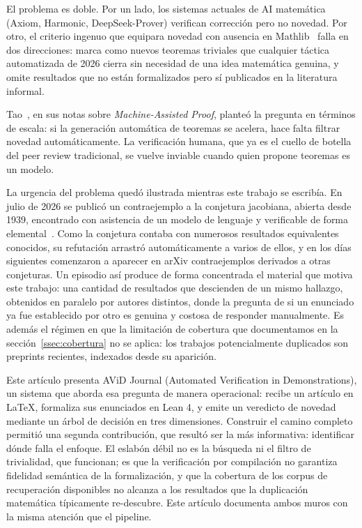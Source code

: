 \documentclass[12pt,a4paper]{article}
\theoremstyle{remark}
\begin{document}
El problema es doble. Por un lado, los sistemas actuales de AI matemática (Axiom, Harmonic, DeepSeek-Prover) verifican corrección pero no novedad. Por otro, el criterio ingenuo que equipara novedad con ausencia en Mathlib~\cite{kasaura2025} falla en dos direcciones: marca como nuevos teoremas triviales que cualquier táctica automatizada de 2026 cierra sin necesidad de una idea matemática genuina, y omite resultados que no están formalizados pero sí publicados en la literatura informal.

Tao~\cite{tao2025}, en sus notas sobre \textit{Machine-Assisted Proof}, planteó la pregunta en términos de escala: si la generación automática de teoremas se acelera, hace falta filtrar novedad automáticamente. La verificación humana, que ya es el cuello de botella del peer review tradicional, se vuelve inviable cuando quien propone teoremas es un modelo.

La urgencia del problema quedó ilustrada mientras este trabajo se escribía. En
julio de 2026 se publicó un contraejemplo a la conjetura jacobiana, abierta
desde 1939, encontrado con asistencia de un modelo de lenguaje y verificable de
forma elemental~\cite{alpoge2026}. Como la conjetura contaba con numerosos
resultados equivalentes conocidos, su refutación arrastró automáticamente a
varios de ellos, y en los días siguientes comenzaron a aparecer en arXiv
contraejemplos derivados a otras conjeturas. Un episodio así produce de forma
concentrada el material que motiva este trabajo: una cantidad de resultados que
descienden de un mismo hallazgo, obtenidos en paralelo por autores distintos,
donde la pregunta de si un enunciado ya fue establecido por otro es genuina y
costosa de responder manualmente. Es además el régimen en que la limitación de
cobertura que documentamos en la sección~\ref{ssec:cobertura} no se aplica: los
trabajos potencialmente duplicados son preprints recientes, indexados desde su
aparición.

Este artículo presenta AViD Journal (Automated Verification in Demonstrations), un sistema que aborda esa pregunta de manera operacional: recibe un artículo en LaTeX, formaliza sus enunciados en Lean 4, y emite un veredicto de novedad mediante un árbol de decisión en tres dimensiones. Construir el camino completo permitió una segunda contribución, que resultó ser la más informativa: identificar dónde falla el enfoque. El eslabón débil no es la búsqueda ni el filtro de trivialidad, que funcionan; es que la verificación por compilación no garantiza fidelidad semántica de la formalización, y que la cobertura de los corpus de recuperación disponibles no alcanza a los resultados que la duplicación matemática típicamente re-descubre. Este artículo documenta ambos muros con la misma atención que el pipeline.
\end{document}
